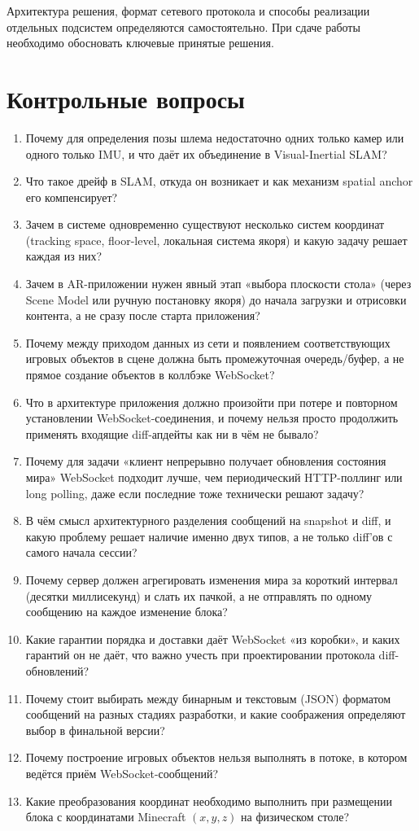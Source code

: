 \documentclass[a4paper,12pt]{article}
\begin{document}
Архитектура решения, формат сетевого протокола и способы реализации отдельных подсистем определяются самостоятельно. При сдаче работы необходимо обосновать ключевые принятые решения.



\section*{Контрольные вопросы}

\begin{enumerate}
    \item Почему для определения позы шлема недостаточно одних только камер или одного только IMU, и что даёт их объединение в Visual-Inertial SLAM?
    \item Что такое дрейф в SLAM, откуда он возникает и как механизм spatial anchor его компенсирует?
    \item Зачем в системе одновременно существуют несколько систем координат (tracking space, floor-level, локальная система якоря) и какую задачу решает каждая из них?
    \item Зачем в AR-приложении нужен явный этап «выбора плоскости стола» (через Scene Model или ручную постановку якоря) до начала загрузки и отрисовки контента, а не сразу после старта приложения?
    \item Почему между приходом данных из сети и появлением соответствующих игровых объектов в сцене должна быть  промежуточная очередь/буфер, а не прямое создание объектов в коллбэке WebSocket?
    \item Что в архитектуре приложения должно произойти при потере и повторном установлении WebSocket-соединения, и почему  нельзя просто продолжить применять входящие diff-апдейты как ни в чём не бывало?
    \item Почему для задачи «клиент непрерывно получает обновления состояния мира» WebSocket подходит лучше, чем  периодический HTTP-поллинг или long polling, даже если последние тоже технически решают задачу?
    \item В чём смысл архитектурного разделения сообщений на snapshot и diff, и какую проблему решает наличие именно двух  типов, а не только diff'ов с самого начала сессии?
     \item Почему сервер должен агрегировать изменения мира за короткий интервал (десятки миллисекунд) и слать их пачкой, а не отправлять по одному сообщению на каждое изменение блока?
    \item Какие гарантии порядка и доставки даёт WebSocket «из коробки», и каких гарантий он не даёт, что важно учесть при проектировании протокола diff-обновлений?
    \item Почему стоит выбирать между бинарным и текстовым (JSON) форматом сообщений на разных стадиях разработки, и какие соображения определяют выбор в финальной версии?

    \item Почему построение игровых объектов нельзя выполнять в потоке, в котором ведётся приём WebSocket-сообщений?
    \item Какие преобразования координат необходимо выполнить при размещении блока с координатами Minecraft $(x, y, z)$ на физическом столе?
\end{enumerate}
\end{document}

